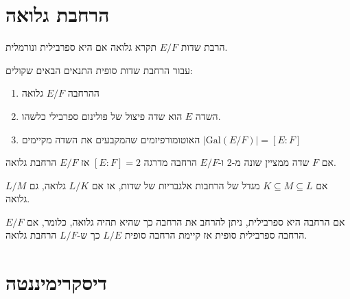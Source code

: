 \documentclass{tstextbook}
\begin{document}
\section{הרחבת גלואה}

\begin{definition}
הרבת שדות \(E / F\) תקרא גלואה אם היא ספרבילית ונורמלית.

\end{definition}
\begin{proposition}
עבור הרחבת שדות סופית התנאים הבאים שקולים:

  \begin{enumerate}
    \item ההרחבה \(E / F\) גלואה 


    \item השדה \(E\) הוא שדה פיצול של פולינום ספרבילי כלשהו. 


    \item האוטומורפיזמים שהמקבעים את השדה מקיימים \(\left\lvert  \mathrm{Gal}(E / F)  \right\rvert=[E:F]\)


  \end{enumerate}
\end{proposition}
\begin{proposition}
אם \(F\) שדה ממציין שונה מ-2 ו-\(E / F\) הרחבה מדרגה \([E:F]=2\) אז \(E / F\) הרחבת גלואה.

\end{proposition}
\begin{proposition}
אם \(K\subseteq M\subseteq L\) מגדל של הרחבות אלגבריות של שדות, אז אם \(L / K\) גלואה, גם \(L / M\) גלואה.

\end{proposition}
\begin{proposition}
אם הרחבה היא ספרבילית, ניתן להרחב את הרחבה כך שהיא תהיה גלואה, כלומר, אם \(E / F\) הרחבה ספרבילית סופית אז קיימת הרחבה סופית \(L / E\) כך ש-\(L / F\) הרחבת גלואה. 

\end{proposition}
\section{דיסקרימיננטה}
\end{document}
